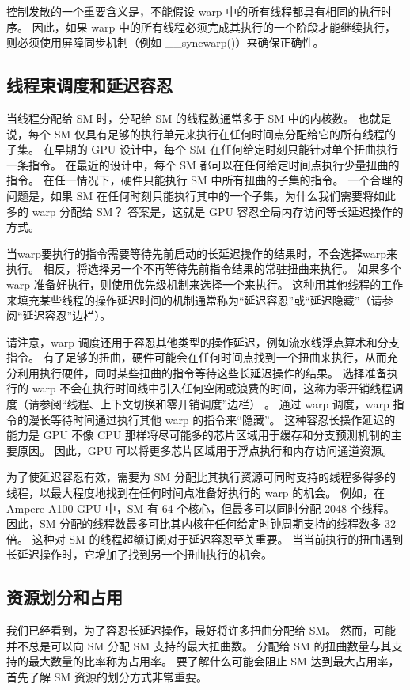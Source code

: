 控制发散的一个重要含义是，不能假设 warp 中的所有线程都具有相同的执行时序。 因此，如果 warp 中的所有线程必须完成其执行的一个阶段才能继续执行，则必须使用屏障同步机制（例如 \_\_syncwarp()）来确保正确性。

\subsection{线程束调度和延迟容忍}
当线程分配给 SM 时，分配给 SM 的线程数通常多于 SM 中的内核数。 也就是说，每个 SM 仅具有足够的执行单元来执行在任何时间点分配给它的所有线程的子集。 在早期的 GPU 设计中，每个 SM 在任何给定时刻只能针对单个扭曲执行一条指令。 在最近的设计中，每个 SM 都可以在任何给定时间点执行少量扭曲的指令。 在任一情况下，硬件只能执行 SM 中所有扭曲的子集的指令。 一个合理的问题是，如果 SM 在任何时刻只能执行其中的一个子集，为什么我们需要将如此多的 warp 分配给 SM？ 答案是，这就是 GPU 容忍全局内存访问等长延迟操作的方式。

当warp要执行的指令需要等待先前启动的长延迟操作的结果时，不会选择warp来执行。 相反，将选择另一个不再等待先前指令结果的常驻扭曲来执行。 如果多个 warp 准备好执行，则使用优先级机制来选择一个来执行。 这种用其他线程的工作来填充某些线程的操作延迟时间的机制通常称为“延迟容忍”或“延迟隐藏”（请参阅“延迟容忍”边栏）。

请注意，warp 调度还用于容忍其他类型的操作延迟，例如流水线浮点算术和分支指令。 有了足够的扭曲，硬件可能会在任何时间点找到一个扭曲来执行，从而充分利用执行硬件，同时某些扭曲的指令等待这些长延迟操作的结果。 选择准备执行的 warp 不会在执行时间线中引入任何空闲或浪费的时间，这称为零开销线程调度（请参阅“线程、上下文切换和零开销调度”边栏） 。 通过 warp 调度，warp 指令的漫长等待时间通过执行其他 warp 的指令来“隐藏”。 这种容忍长操作延迟的能力是 GPU 不像 CPU 那样将尽可能多的芯片区域用于缓存和分支预测机制的主要原因。 因此，GPU 可以将更多芯片区域用于浮点执行和内存访问通道资源。

为了使延迟容忍有效，需要为 SM 分配比其执行资源可同时支持的线程多得多的线程，以最大程度地找到在任何时间点准备好执行的 warp 的机会。 例如，在 Ampere A100 GPU 中，SM 有 64 个核心，但最多可以同时分配 2048 个线程。 因此，SM 分配的线程数最多可比其内核在任何给定时钟周期支持的线程数多 32 倍。 这种对 SM 的线程超额订阅对于延迟容忍至关重要。 当当前执行的扭曲遇到长延迟操作时，它增加了找到另一个扭曲执行的机会。

\subsection{资源划分和占用}
我们已经看到，为了容忍长延迟操作，最好将许多扭曲分配给 SM。 然而，可能并不总是可以向 SM 分配 SM 支持的最大扭曲数。 分配给 SM 的扭曲数量与其支持的最大数量的比率称为占用率。 要了解什么可能会阻止 SM 达到最大占用率，首先了解 SM 资源的划分方式非常重要。

